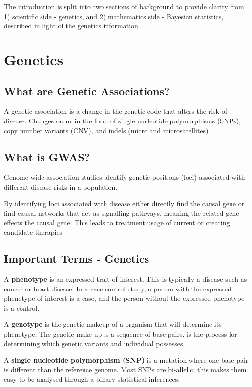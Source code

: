 The introduction is split into two sections of background to provide clarity from 1) scientific side - genetics, and 2) mathematics side - Bayesian statistics, described in light of the genetics information.

\section{Genetics}

\subsection{What are Genetic Associations?}
A genetic association is a change in the genetic code that alters the risk of disease. Changes occur in the form of single nucleotide polymorphisms (SNPs), copy number variants (CNV), and indels (micro and microsatellites) 

\subsection{What is GWAS?}
Genome wide association studies identify genetic positions (loci) associated with different disease risks in a population. 

By identifying loci associated with disease either directly find the causal gene or find causal networks that act as signalling pathways, meaning the related gene effects the causal gene. This leads to treatment usage of current or creating candidate therapies. 

\subsection{Important Terms - Genetics}


A \textbf{phenotype} is an expressed trait of interest. This is typically a disease such as cancer or heart disease. In a case-control study, a person with the expressed phenotype of interest is a case, and the person without the expressed phenotype is a control. 

A \textbf{genotype} is the genetic makeup of a organism that will determine its phenotype. The genetic make up is a sequence of base pairs.  is the process for determining which genetic variants and individual possesses.

A \textbf{single nucleotide polymorphism (SNP)} is a mutation where one base pair is different than the reference genome. Most SNPs are bi-allelic; this makes them easy to be analysed through a binary statistical inferences. 

